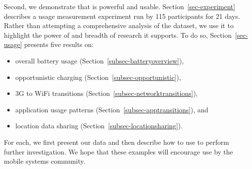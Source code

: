 Second, we demonstrate that \PhoneLab{} is powerful and usable.
Section~\ref{sec-experiment} describes a usage measurement experiment run by
115 \PhoneLab{} participants for 21 days. Rather than attempting a
comprehensive analysis of the dataset, we use it to highlight the power of
\PhoneLab{} and breadth of research it supports. To do so,
Section~\ref{sec-usage} presents five results on:

\begin{itemize}[nosep]
\vspace*{0.08in}
\item overall battery usage (Section~\ref{subsec-batteryoverview}),
\item opportunistic charging (Section~\ref{subsec-opportunistic}),
\item 3G to WiFi transitions (Section~\ref{subsec-networktransitions}),
\item application usage patterns (Section~\ref{subsec-apptransitions}), and
\item location data sharing (Section~\ref{subsec-locationsharing}).
\vspace*{0.08in}
\end{itemize}

For each, we first present our data and then describe how to use \PhoneLab{}
to perform further investigation. We hope that these examples will encourage
\PhoneLab{} use by the mobile systems community.
